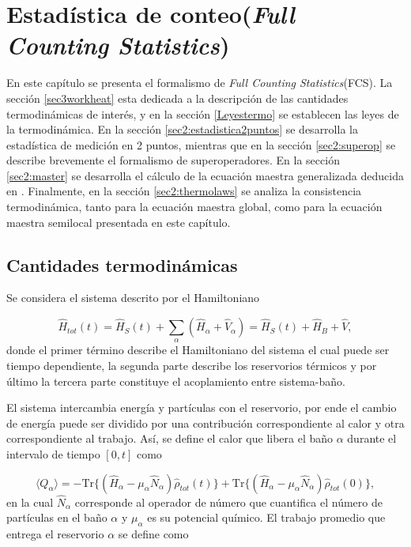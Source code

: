 \label{sec:lindblad}


\chapter{Estadística de conteo(\textit{Full Counting Statistics}) }
En este capítulo se presenta el formalismo de \textit{Full Counting Statistics}(FCS). La sección \ref{sec3workheat} esta dedicada a la  descripción de las cantidades termodinámicas de interés, y en la sección \ref{Leyestermo} se establecen las leyes de la termodinámica. En la sección \ref{sec2:estadistica2puntos} se desarrolla la estadística de medición en 2 puntos, mientras que en la sección \ref{sec2:superop} se describe brevemente el formalismo de superoperadores. En la sección \ref{sec2:master} se desarrolla el cálculo de la ecuación maestra generalizada deducida en \cite{potts2021thermodynamically}. Finalmente, en la sección \ref{sec2:thermolaws} se analiza la consistencia termodinámica, tanto para la ecuación maestra global, como para la ecuación maestra semilocal presentada en este capítulo. 

\section{Cantidades termodinámicas}
Se considera el sistema descrito por el Hamiltoniano

\begin{equation*}
    \hat{H}_{tot}(t) = \hat{H}_{S}(t) + \sum_{\alpha}(\hat{H}_{\alpha} + \hat{V}_{\alpha})  = \hat{H}_{S}(t) + \hat{H}_{B} + \hat{V},
\end{equation*}
donde el primer término describe el Hamiltoniano del sistema el cual puede ser tiempo dependiente, la segunda parte describe los reservorios térmicos y por último la tercera parte constituye el acoplamiento entre sistema-baño.

El sistema intercambia energía y partículas con el reservorio, por ende el cambio de energía puede ser dividido por una contribución correspondiente al calor y otra correspondiente al trabajo. Así, se define el calor que libera el baño $\alpha$ durante el intervalo de tiempo $[0,t]$ como

\begin{equation}
    \langle Q_{\alpha}\rangle = - \text{Tr}\{(\hat{H}_{\alpha} - \mu_{\alpha}\hat{N}_{\alpha})\hat{\rho}_{tot}(t) \} + \text{Tr}\{(\hat{H}_{\alpha} - \mu_{\alpha}\hat{N}_{\alpha})\hat{\rho}_{tot}(0) \},
\label{sec3:calor}
\end{equation}
en la cual $\hat{N}_{\alpha}$ corresponde al operador de número que cuantifica el número de partículas en el baño $\alpha$ y $\mu_{\alpha}$ es su potencial químico. El trabajo promedio que entrega el reservorio $\alpha$ se define como

